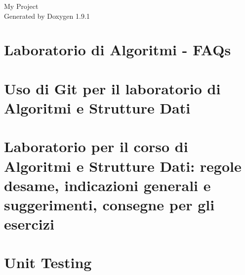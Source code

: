 \let\mypdfximage\pdfximage\def\pdfximage{\immediate\mypdfximage}\documentclass[twoside]{book}
\newcommand{\+}{\discretionary{\mbox{\scriptsize$\hookleftarrow$}}{}{}}
\newcommand{\clearemptydoublepage}{%
  \newpage{\pagestyle{empty}\cleardoublepage}%
}
\begin{document}
\raggedbottom

\hypersetup{pageanchor=false,
             bookmarksnumbered=true,
             pdfencoding=unicode
            }
\begin{titlepage}
\vspace*{7cm}
\begin{center}%
{\Large My Project }\\
\vspace*{1cm}
{\large Generated by Doxygen 1.9.1}\\
\end{center}
\end{titlepage}
\clearemptydoublepage
{}
\tableofcontents
\clearemptydoublepage
{}
\hypersetup{pageanchor=true}

\chapter{Laboratorio di Algoritmi -\/ FAQs}
\label{md_FAQ}

\chapter{Uso di Git per il laboratorio di Algoritmi e Strutture Dati}
\label{md_Git}

\chapter{Laboratorio per il corso di Algoritmi e Strutture Dati\+: regole d\textquotesingle{}esame, indicazioni generali e suggerimenti, consegne per gli esercizi}
\label{md_README}

\chapter{Unit Testing}
\label{md_UnitTesting}


\backmatter
\newpage
{}
\clearemptydoublepage
{}
\printindex
\end{document}
